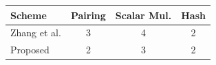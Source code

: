 
\begin{table}[t]
\label{tab:cost}
\centering
\fontsize{8pt}{11pt}\selectfont
\begin{tabular}{lccc}
\toprule
Scheme & Pairing & Scalar Mul. & Hash \\
\midrule
Zhang et al. & 3 & 4 & 2 \\
Proposed     & 2 & 3 & 2 \\
\bottomrule
\end{tabular}
\end{table}